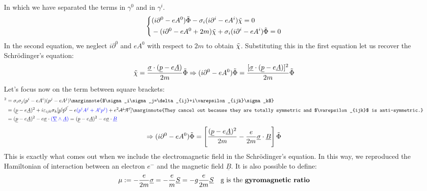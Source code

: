 \documentclass[../main.tex]{subfiles}
\begin{document}
In which we have separated the terms in $\gamma^0$ and in $\gamma^i$.
\[
\left\{
\begin{aligned}
&(i\partial^0-eA^0)\Tilde{\Phi}-\sigma_i(i\partial^i-eA^i)\Tilde{\chi}=0\\
&-(i\partial^0-eA^0+2m)\Tilde{\chi}+\sigma_i(i\partial^i-eA^i)\Tilde{\Phi}=0
\end{aligned}
\right.
\]
In the second equation, we neglect $i\partial^0$ and $eA^0$ with respect to $2m$ to obtain $\Tilde{\chi}$. Substituting this in the first equation let us recover the Schr\"odinger's equation:
\[
\Tilde{\chi}=\frac{\underline{\sigma}\cdot(\underline{p}-e\underline{A})}{2m}\Tilde{\Phi}\Rightarrow(i\partial^0-eA^0)\Tilde{\Phi}=\frac{[\underline{\sigma}\cdot(\underline{p}-e\underline{A})]^2}{2m}\Tilde{\Phi}
\]
Let's focus now on the term between square brackets:
\begin{align*}
[\underline{\sigma}\cdot(\underline{p}-e\underline{A})]^2&=\sigma_i\sigma_j(p^i-eA^i)(p^j-eA^j)\marginnote{$\sigma_i\sigma_j=\delta_{ij}+i\varepsilon_{ijk}\sigma_k$}\\
&=(\underline{p}-e\underline{A})^2+i\varepsilon_{ijk}\sigma_k[\cancel{p^ip^j}-e{\color{blue}(p^iA^j+A^ip^j)}+e^2\cancel{A^iA^j}]\marginnote{They cancel out because they are totally symmetric and $\varepsilon_{ijk}$ is anti-symmetric.}\\
&=(\underline{p}-e\underline{A})^2-e\underline{\sigma}\cdot{\color{blue}(\underline{\nabla}\wedge\underline{A})}=(\underline{p}-e\underline{A})^2-e\underline{\sigma}\cdot{\color{blue}\underline{B}}
\end{align*}
\[
\Rightarrow(i\partial^0-eA^0)\Tilde{\Phi}=\left[\frac{(\underline{p}-e\underline{A})^2}{2m}-\frac{e}{2m}\underline{\sigma}\cdot\underline{B}\right]\Tilde{\Phi}
\]
This is exactly what comes out when we include the electromagnetic field in the Schr\"odinger's equation. In this way, we reproduced the Hamiltonian of interaction between an electron $e^-$ and the magnetic field $\underline{B}$. It is also possible to define:
\[
\mu:=-\frac{e}{2m}\underline{\sigma}=-\frac{e}{m}\underline{S}=-g\frac{e}{2m}\underline{S} \quad \text{g is the \textbf{gyromagnetic ratio}}
\]
\end{document}
